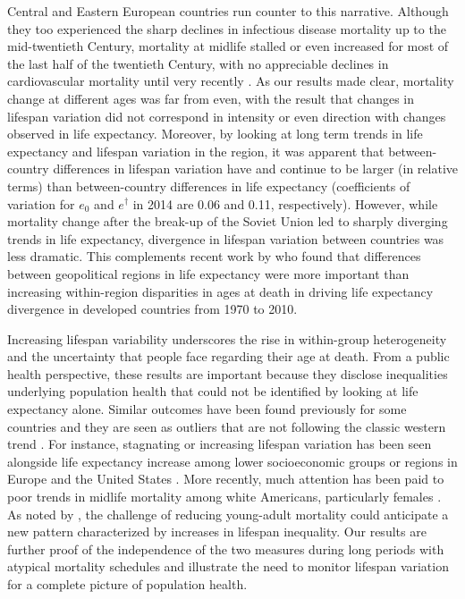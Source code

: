 \documentclass{article}
\begin{document}
\begin{spacing}{1.5}
Central and Eastern European countries run counter to this narrative. Although they too experienced the sharp declines in infectious disease mortality up to the mid-twentieth Century, mortality at midlife stalled or even increased for most of the last half of the twentieth Century, with no appreciable declines in cardiovascular mortality until very recently \citep{grigoriev2014recent}.  As our results made clear, mortality change at different ages was far from even, with the result that changes in lifespan variation did not correspond in intensity or even direction with changes observed in life expectancy.
Moreover, by looking at long term trends in life expectancy and lifespan variation in the region, it was apparent that between-country differences in lifespan variation have and continue to be larger (in relative terms) than between-country differences in life expectancy (coefficients of variation for $e_0$ and $e^\dagger$ in 2014 are 0.06 and 0.11, respectively). However, while mortality change after the break-up of the Soviet Union led to sharply diverging trends in life expectancy, divergence in lifespan variation between countries was less dramatic. This complements recent work by \citet{timonin2016disparities} who found that differences between geopolitical regions in life expectancy were more important than increasing within-region disparities in ages at death in driving life expectancy divergence in developed countries from 1970 to 2010.

Increasing lifespan variability underscores the rise in within-group heterogeneity and the uncertainty that people face regarding their age at death.  From a public health perspective, these results are important because they disclose inequalities underlying population health that could not be identified by looking at life expectancy alone. Similar outcomes have been found previously for some countries and they are seen as outliers that are not following the classic western trend \citep{wilmoth1999,zhang2009}. For instance, stagnating or increasing lifespan variation has been seen alongside life expectancy increase among lower socioeconomic groups or regions in Europe \citep{vanraalte2014,bronnum-hansen2017,seaman2016increasing} and the United States \citep{sasson2016trends}. More recently, much attention has been paid to poor trends in midlife mortality among white Americans, particularly females \citep{case2015rising,montez2013trends}. As noted by \citet{gillespie2014divergence}, the challenge of reducing young-adult mortality could anticipate a new pattern characterized by increases in lifespan inequality. Our results are further proof of the independence of the two measures during long periods with atypical mortality schedules and illustrate the need to monitor lifespan variation for a complete picture of population health.\\


\end{spacing}
\end{document}
